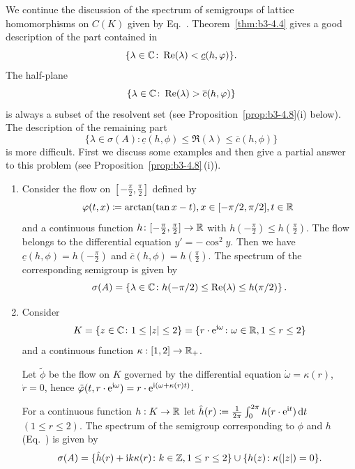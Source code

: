 We continue the discussion of the spectrum of semigroups of lattice homomorphisms on $C(K)$ given by Eq.~.
Theorem~\ref{thm:b3-4.4} gives a good description of the part contained in 
\[
\{\lambda \in \C \colon \Re(\lambda) < \underline{c}(h,\phi)\} .
\]
The half-plane 
\[
\{\lambda \in \C \colon \Re(\lambda) > \overline{c}(h,\phi)\}
\] 
is always a subset of the resolvent set (see Proposition~\ref{prop:b3-4.8}(i) below).
The description of the remaining part 
\[\{\lambda \in \sigma(A) \colon \underline{c}(h,\phi) \leq \Re(\lambda) \leq \overline{c}(h,\phi)\}
\]
is more difficult.
First we discuss some examples and then give a partial answer to this problem (see Proposition~\ref{prop:b3-4.8}\,(i)).
\begin{example}\label{ex:b3-4.7}
	\begin{enumerate}[\upshape (i), wide, labelindent=.25em]
		\item 
		Consider the flow on $[-\frac{\pi}{2},\frac{\pi}{2}]$ defined by
		\[
		\phi(t,x)\coloneq \arctan(\tan x - t) , x \in [-{\pi}/{2},{\pi}/{2}], 
		t \in \R\
		\] 
		and a continuous function $h \colon [-\frac{\pi}{2},\frac{\pi}{2}] \to \mathbb{R}$ with $h(-\frac{\pi}{2}) \leq h(\frac{\pi}{2})$. The flow belongs to the differential equation $y' = -\cos^2y$. 
		Then we have $\underline{c}(h,\phi) = h(-\frac{\pi}{2})$ and $\overline{c}(h,\phi) = h(\frac{\pi}{2})$.
		The spectrum of the corresponding semigroup is given by 
		\[
		\sigma(A) = \left\{\lambda \in \C \colon h(-\pi/2) \leq \Re(\lambda) \leq h(\pi/2)\right\}.
		\]
		
		\item 
		Consider 
        \[
        K = \{z \in \C \colon 1 \leq |z| \leq 2\} = \{r\cdot \eu^{\mathcal{\im\omega}} \colon \omega\in \R, 1 \leq r \leq 2\}
         \]
         and a continuous function $\kappa: [1,2] \to \mathbb{R}_+$.
		
		Let $\tilde{\phi}$ be the flow on $K$ governed by the differential equation $\dot{\omega} = \kappa(r)$, $\dot{r} = 0$, hence $\tilde{\phi}(t,r\cdot \eu^{\im\omega}) = r\cdot \eu^{\im(\omega + \kappa(r)t)}$.
		
		For a continuous function $h: K \to \mathbb{R}$ let $\hat{h}(r) \coloneq \frac{1}{2\pi}\int_{0}^{2\pi} h(r\cdot \mathrm{e}^{\mathrm{i} t}) \mathop{}\!\mathrm{d}{t}$ $(1 \leq r \leq 2)$.
		The spectrum of the semigroup corresponding to $\phi$ and $h$ (\cf Eq.~\myeqpageref{eq:b3-4.1}) is given by
		\[
		\sigma(A) = \{\hat{h}(r) +  \im k\kappa(r) \colon k \in \Z, 1 \leq r \leq 2\} \cup \{h(z) \colon \kappa(|z|) = 0\}.
		\]
	\end{enumerate}
\end{example}

